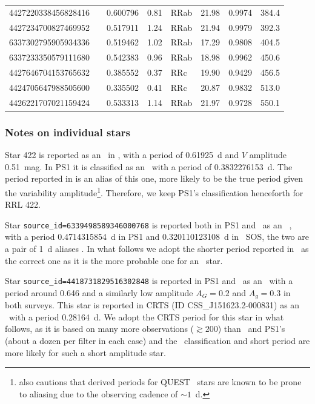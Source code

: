 \documentclass[twocolumn]{aastex63}
\begin{document}
\begin{table}[t]
\begin{footnotesize}
\begin{tabular}{llllllll}
4427220338456828416 &     & 0.600796& 0.81 & RRab & 21.98 & 0.9974 & 384.4 \\
4427234700827469952 &     & 0.517911& 1.24 & RRab & 21.94 & 0.9979 & 392.3 \\
6337302795905934336 &     & 0.519462& 1.02 & RRab & 17.29 & 0.9808 & 404.5 \\
6337233350579111680 &     & 0.542383& 0.96 & RRab & 18.98 & 0.9962 & 450.6 \\
4427646704153765632 &     & 0.385552& 0.37 & RRc  & 19.90 & 0.9429 & 456.5 \\
4424705647988505600 &     & 0.335502& 0.41 & RRc  & 20.87 & 0.9832 & 513.0 \\
4426221707021159424 &     & 0.533313& 1.14 & RRab & 21.97 & 0.9728 & 550.1 \\
\bottomrule
\end{tabular}
\end{footnotesize}
\end{table}

\subsubsection{Notes on individual stars}

Star 422 is reported as an \rrc~in \citet{Vivas2004}, with a period of 0.61925~d and $V$ amplitude 0.51~mag. In PS1 it is classified as an \rrc~with a period of 0.3832276153~d. The period reported in \citet{Vivas2004} is an alias of this one, more likely to be the true period given the variability amplitude\footnote{\citet{Vivas2004} also cautions that derived periods for QUEST \rrc~stars are known to be prone to aliasing due to the observing cadence of $\sim1$~d.}. Therefore, we keep PS1's classification henceforth for RRL 422.

Star \verb+source_id=6339498589346000768+ is reported both in PS1 and \Gaia~as an \rrc~, with a period 0.4714315854~d in PS1 and 0.320110123108~d in \Gaia~SOS, the two are a pair of 1~d aliases \citep[see e.g.]{Lafler1965}. In what follows we adopt the shorter period reported in \Gaia~as the correct one as it is the more probable one for an \rrc~star.

Star \verb+source_id=4418731829516302848+ is reported in PS1 and \Gaia~as an \rrab~with a period around 0.646 and a similarly low amplitude $A_G=0.2$ and $A_g=0.3$ in both surveys. This star is reported in CRTS \citep{Drake2014} (ID CSS\_J151623.2-000831) as an \rrc~with a period 0.28164~d. We adopt the CRTS period for this star in what follows, as it is based on many more observations ($\gtrsim200$) than \Gaia~and PS1's (about a dozen per filter in each case) and the \rrc~classification and short period are more likely for such a short amplitude star.
\end{document}
